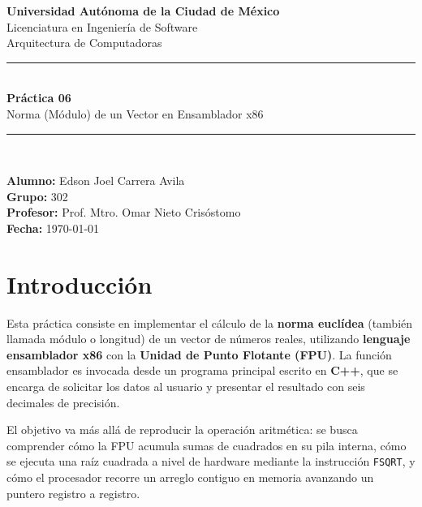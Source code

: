 \documentclass[12pt, letterpaper]{article}
\begin{document}
\begin{titlepage}
    \centering
    \vspace*{1.5cm}

    {\Large \textbf{Universidad Autónoma de la Ciudad de México}}\\[0.3cm]
    {\large Licenciatura en Ingeniería de Software}\\[0.2cm]
    {\large Arquitectura de Computadoras}\\[2.5cm]

    \rule{\linewidth}{0.5pt}\\[0.4cm]
    {\LARGE \bfseries Práctica 06}\\[0.3cm]
    {\Large Norma (Módulo) de un Vector en Ensamblador x86}\\[0.3cm]
    \rule{\linewidth}{0.5pt}\\[2cm]

    \begin{flushleft}
        \textbf{Alumno:} Edson Joel Carrera Avila \\[0.3cm]
        \textbf{Grupo:} 302 \\[0.3cm]
        \textbf{Profesor:} Prof. Mtro. Omar Nieto Crisóstomo \\[0.3cm]
        \textbf{Fecha:} \today
    \end{flushleft}
    \vfill
\end{titlepage}

\tableofcontents
\newpage

\section{Introducción}

Esta práctica consiste en implementar el cálculo de la \textbf{norma euclídea} (también llamada módulo o longitud) de un vector de números reales, utilizando \textbf{lenguaje ensamblador x86} con la \textbf{Unidad de Punto Flotante (FPU)}. La función ensamblador es invocada desde un programa principal escrito en \textbf{C++}, que se encarga de solicitar los datos al usuario y presentar el resultado con seis decimales de precisión.

El objetivo va más allá de reproducir la operación aritmética: se busca comprender cómo la FPU acumula sumas de cuadrados en su pila interna, cómo se ejecuta una raíz cuadrada a nivel de hardware mediante la instrucción \texttt{FSQRT}, y cómo el procesador recorre un arreglo contiguo en memoria avanzando un puntero registro a registro.
\end{document}
